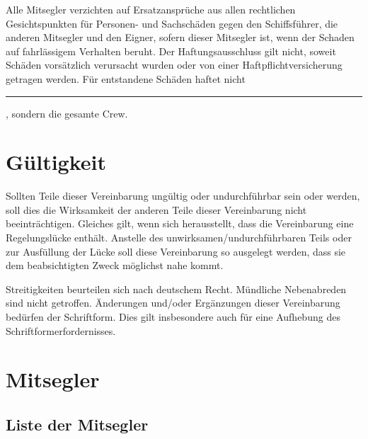 \documentclass[a4paper,12pt]{article}
\newcommand{\openlength}[1]{\rule{#1}{.4pt}}
\newcommand{\open}{\openlength{3cm}}
\newcommand{\skipper}{\open}
\begin{document}
Alle Mitsegler verzichten auf Ersatzansprüche aus allen rechtlichen Gesichtspunkten für Per\-so\-nen- und Sachschäden gegen den Schiffsführer, die anderen Mitsegler und den Eigner, sofern dieser Mitsegler ist, wenn der Schaden auf fahrlässigem Verhalten beruht.
Der Haftungsausschluss gilt nicht, soweit Schäden vorsätzlich verursacht wurden oder von einer Haftpflichtversicherung getragen werden.
Für entstandene Schäden haftet nicht \skipper, sondern die gesamte Crew.


\section{Gültigkeit}
\label{sec:Gueltigkeit}

Sollten Teile dieser Vereinbarung ungültig oder undurchführbar sein oder werden, soll dies die Wirksamkeit der anderen Teile dieser Vereinbarung nicht beeinträchtigen.
Gleiches gilt, wenn sich herausstellt, dass die Vereinbarung eine Regelungslücke enthält.
Anstelle des unwirksamen/undurchführbaren Teils oder zur Ausfüllung der Lücke soll diese Vereinbarung so ausgelegt werden, dass sie dem beabsichtigten Zweck möglichst nahe kommt.

Streitigkeiten beurteilen sich nach deutschem Recht.
Mündliche Nebenabreden sind nicht getroffen.
Änderungen und/oder Ergänzungen dieser Vereinbarung bedürfen der Schriftform.
Dies gilt insbesondere auch für eine Aufhebung des Schriftformerfordernisses.


\section{Mitsegler}
\label{sec:Mitsegler}

\subsection*{Liste der Mitsegler}
\end{document}
